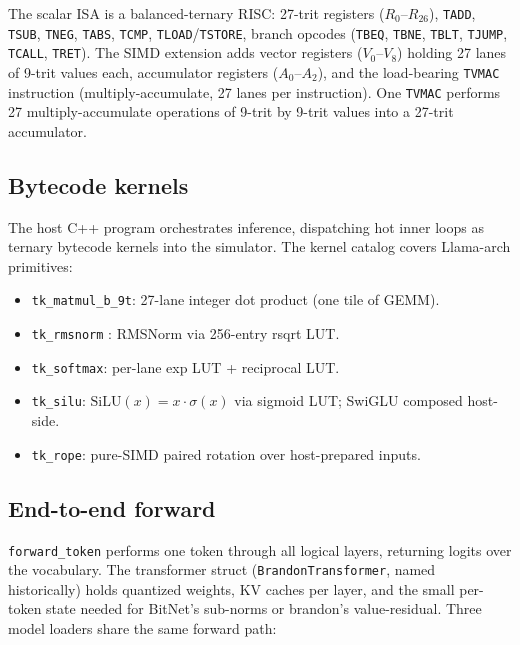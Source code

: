 \documentclass{article}
\begin{document}
The scalar {ISA} is a balanced-ternary {RISC}: 27-trit registers
($R_0$--$R_{26}$), \texttt{TADD}, \texttt{TSUB}, \texttt{TNEG},
\texttt{TABS}, \texttt{TCMP}, \texttt{TLOAD}/\texttt{TSTORE}, branch
opcodes (\texttt{TBEQ}, \texttt{TBNE}, \texttt{TBLT},
\texttt{TJUMP}, \texttt{TCALL}, \texttt{TRET}). The {SIMD} extension
adds vector registers ($V_0$--$V_8$) holding 27 lanes of 9-trit values
each, accumulator registers ($A_0$--$A_2$), and the load-bearing
\texttt{TVMAC} instruction (multiply-accumulate, 27 lanes per
instruction). One \texttt{TVMAC} performs 27 multiply-accumulate
operations of 9-trit by 9-trit values into a 27-trit accumulator.

\subsection{Bytecode kernels}

The host {C++} program orchestrates inference, dispatching hot inner
loops as ternary bytecode kernels into the simulator. The kernel
catalog covers Llama-arch primitives:

\begin{itemize}
  \item \texttt{tk\_matmul\_b\_9t}: 27-lane integer dot product (one
    tile of {GEMM}).
  \item \texttt{tk\_rmsnorm} \citep{rmsnorm-2019}: {RMSNorm} via 256-entry
    rsqrt {LUT}.
  \item \texttt{tk\_softmax}: per-lane exp {LUT} + reciprocal {LUT}.
  \item \texttt{tk\_silu}: $\mathrm{SiLU}(x) = x \cdot \sigma(x)$ via
    sigmoid {LUT}; SwiGLU \citep{swiglu-2020} composed host-side.
  \item \texttt{tk\_rope}: pure-{SIMD} paired rotation
    \citep{rope-2024} over host-prepared inputs.
\end{itemize}

\subsection{End-to-end forward}

\texttt{forward\_token} performs one token through all logical layers,
returning logits over the vocabulary. The transformer struct
(\texttt{BrandonTransformer}, named historically) holds quantized
weights, {KV} caches per layer, and the small per-token state needed
for {BitNet}'s sub-norms or brandon's value-residual. Three model
loaders share the same forward path:
\end{document}
